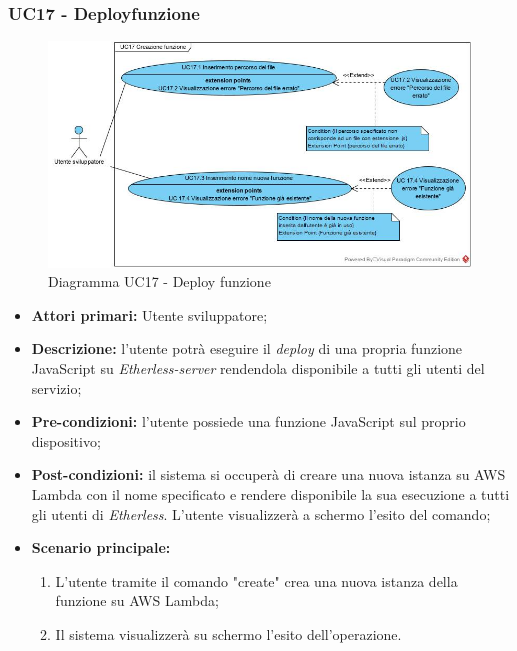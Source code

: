 \subsubsection{UC17 - Deploy\glo funzione}
\begin{figure}[h]
	\centering
	\includegraphics[width=\linewidth]{res/img/UC17.jpg}
	\caption{Diagramma UC17 - Deploy funzione}
\end{figure}
\begin{itemize}
	\item \textbf{Attori primari:} Utente sviluppatore;
	\item \textbf{Descrizione:} l'utente potrà eseguire il \textit{deploy\glo} di una propria funzione JavaScript su \textit{Etherless-server} rendendola disponibile a tutti gli utenti del servizio;
	\item \textbf{Pre-condizioni:} l'utente possiede una funzione JavaScript sul proprio dispositivo;
	\item \textbf{Post-condizioni:} il sistema si occuperà di creare una nuova istanza su AWS Lambda con il nome specificato e rendere disponibile la sua esecuzione a tutti gli utenti di \textit{Etherless}. L'utente visualizzerà a schermo l'esito del comando;
	\item \textbf{Scenario principale:}
	\begin{enumerate}
		\item L'utente tramite il comando "create" crea una nuova istanza della funzione su AWS Lambda;
		\item Il sistema visualizzerà su schermo l'esito dell'operazione.
	\end{enumerate}
\end{itemize}
